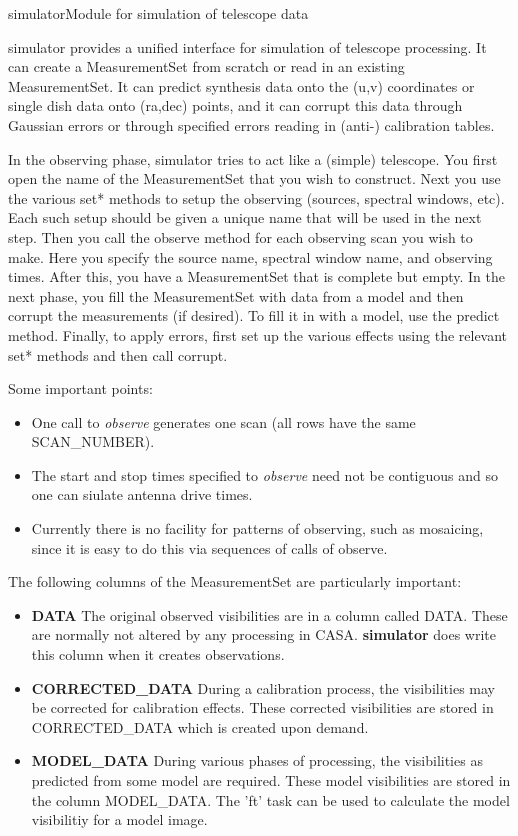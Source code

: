 \begin{ahmodule}{simulator}{Module for simulation of telescope data}


\bigskip
{} 

simulator provides a unified interface for simulation of telescope
processing. It can create a MeasurementSet from scratch or read in
an existing MeasurementSet. It can predict synthesis data onto the
(u,v) coordinates or single dish data onto (ra,dec) points, and it 
can corrupt this data through Gaussian errors or through specified
errors reading in (anti-) calibration tables.

In the observing phase, simulator tries to act like a (simple)
telescope. You first open the name of the MeasurementSet that
you wish to construct. Next you use the various set* methods
to setup the observing (sources, spectral windows, etc). Each
such setup should be given a unique name that will be used in
the next step. Then you call the observe method for each observing scan 
you wish to make. Here you specify the source name, spectral window 
name, and observing times. After this, you have a MeasurementSet that is
complete but empty. In the next phase, you fill the
MeasurementSet with data from a model and then corrupt the measurements
(if desired). To fill it in with a model, use the predict method.
Finally, to apply errors, first set up the various effects using the 
relevant set* methods and then call corrupt.

Some important points:
\begin{itemize}
\item One call to {\it observe} generates one scan (all rows have the same SCAN\_NUMBER).
\item The start and stop times specified to {\it observe} need not be contiguous and so
one can siulate antenna drive times.
\item Currently there is no facility for patterns of observing, such as mosaicing, since it is easy to
do this via sequences of calls of observe.
\end{itemize}

The following columns of the MeasurementSet are particularly important:
\begin{itemize}
\item {\bf DATA} The original observed visibilities are in a column called DATA. These are normally not altered by any processing in CASA. {\bf simulator} does write this column when it creates observations.
\item {\bf CORRECTED\_DATA} During a calibration process, the visibilities may be corrected for calibration effects. These corrected visibilities are stored in CORRECTED\_DATA which is created upon demand.
\item {\bf MODEL\_DATA} During various phases of processing, the visibilities as predicted from some model are required. These model visibilities are stored in the column MODEL\_DATA. The 'ft' task can be used to calculate the model visibilitiy for a model image.
\end{itemize}


\end{ahmodule}
